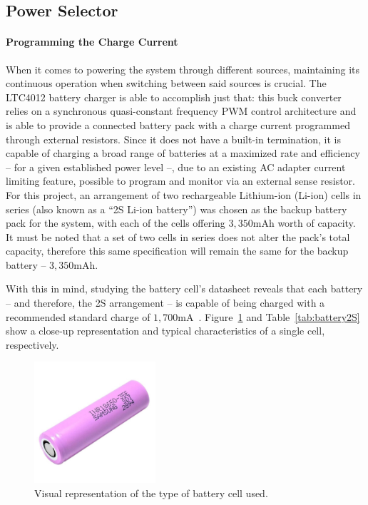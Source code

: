 \subsection{Power Selector}\label{sec:3211_LTC4012}

\paragraph{Programming the Charge Current}	When it comes to powering the system through different sources, maintaining its continuous operation when switching between said sources is crucial. The LTC4012 battery charger is able to accomplish just that: this buck converter relies on a synchronous quasi-constant frequency \gls{PWM} control architecture and is able to provide a connected battery pack with a charge current programmed through external resistors. Since it does not have a built-in termination, it is capable of charging a broad range of batteries at a maximized rate and efficiency -- for a given established power level --, due to an existing \gls{AC} adapter current limiting feature, possible to program and monitor via an external sense resistor. For this project, an arrangement of two rechargeable Lithium-ion (Li-ion) cells in series (also known as a ``2S Li-ion battery'') was chosen as the backup battery pack for the system, with each of the cells offering $3,350$mAh worth of capacity. It must be noted that a set of two cells in series does not alter the pack's total capacity, therefore this same specification will remain the same for the backup battery -- $3,350$mAh.

With this in mind, studying the battery cell's datasheet reveals that each battery -- and therefore, the 2S arrangement -- is capable of being charged with a recommended standard charge of $1,700$mA~\cite{INR18650-35E}.
Figure~\ref{fig:battery2S} and Table~\ref{tab:battery2S} show a close-up representation and typical characteristics of a single cell, respectively.

\begin{figure}[h]
	\centering
	\includegraphics[width=0.4\textwidth]{Chapters/Figures/chapter3/bateria-li-ion-mr-18650-3-6v-3500mah-samsung-inr18650-35e.jpg}
	\caption{Visual representation of the type of battery cell used.}
	\label{fig:battery2S}
\end{figure}

